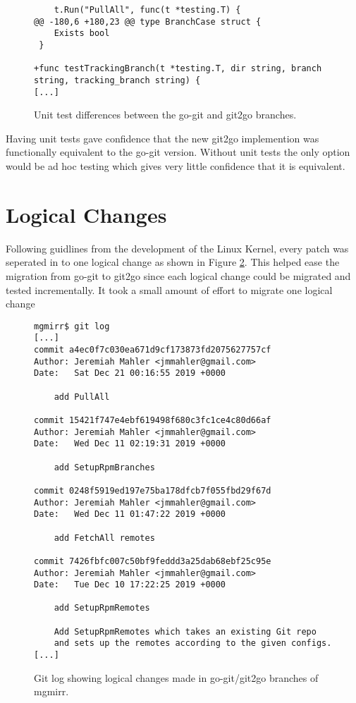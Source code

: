 \documentclass{article}
\begin{document}
\begin{figure}[!ht]
\begin{lstlisting}
 	t.Run("PullAll", func(t *testing.T) {
@@ -180,6 +180,23 @@ type BranchCase struct {
 	Exists bool
 }

+func testTrackingBranch(t *testing.T, dir string, branch string, tracking_branch string) {
[...]
\end{lstlisting}
\caption{Unit test differences between the go-git and git2go branches.}
\label{fig:unit-test-diff}
\end{figure}

Having unit tests gave confidence that the new git2go implemention was
functionally equivalent to the go-git version.
Without unit tests the only option would be ad hoc testing which
gives very little confidence that it is equivalent.

\section{Logical Changes}

Following guidlines from the development of the Linux Kernel,
every patch was seperated in to one logical change\autocite{logical-change}
as shown in Figure \ref{fig:logical-change}.
This helped ease the migration from go-git to git2go since each
logical change could be migrated and tested incrementally.
It took a small amount of effort to migrate one logical change

\begin{figure}
\begin{lstlisting}
mgmirr$ git log
[...]
commit a4ec0f7c030ea671d9cf173873fd2075627757cf
Author: Jeremiah Mahler <jmmahler@gmail.com>
Date:   Sat Dec 21 00:16:55 2019 +0000

    add PullAll

commit 15421f747e4ebf619498f680c3fc1ce4c80d66af
Author: Jeremiah Mahler <jmmahler@gmail.com>
Date:   Wed Dec 11 02:19:31 2019 +0000

    add SetupRpmBranches

commit 0248f5919ed197e75ba178dfcb7f055fbd29f67d
Author: Jeremiah Mahler <jmmahler@gmail.com>
Date:   Wed Dec 11 01:47:22 2019 +0000

    add FetchAll remotes

commit 7426fbfc007c50bf9feddd3a25dab68ebf25c95e
Author: Jeremiah Mahler <jmmahler@gmail.com>
Date:   Tue Dec 10 17:22:25 2019 +0000

    add SetupRpmRemotes

    Add SetupRpmRemotes which takes an existing Git repo
    and sets up the remotes according to the given configs.
[...]
\end{lstlisting}
\caption{Git log showing logical changes made in go-git/git2go branches of mgmirr.}
\label{fig:logical-change}
\end{figure}
\end{document}

